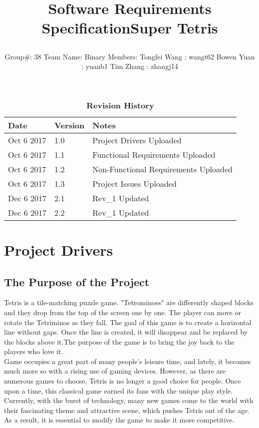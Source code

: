 \documentclass[12pt, titlepage]{article}
\title{\parbox{\linewidth}{\centering Software Requirements Specification\endgraf\bigskip Super Tetris}}
\author{\parbox{\linewidth}{\bigskip \centering Group\#: 38 \endgraf\bigskip Team Name: Binary \endgraf\bigskip Members: \endgraf\bigskip Tongfei Wang : wangt62 \endgraf\bigskip Bowen Yuan : yuanb1 \endgraf\bigskip Tim Zhang : zhangj14}}
\date{\parbox{\linewidth}{\bigskip\bigskip \centering \today\endgraf\bigskip SFWR ENG 3XA3 \endgraf\bigskip McMaster University}}
\begin{document}
\maketitle

\tableofcontents
\listoftables
\listoffigures

\begin{table}[bp]
\caption{\bf Revision History}
\begin{tabularx}{\textwidth}{p{3cm}p{2cm}X}
\toprule {\bf Date} & {\bf Version} & {\bf Notes}\\
\midrule
Oct 6 2017 & 1.0 & Project Drivers Uploaded\\
Oct 6 2017 & 1.1 & Functional Requirements Uploaded\\
Oct 6 2017 & 1.2 & Non-Functional Requirements Uploaded\\
Oct 6 2017 & 1.3 & Project Issues Uploaded\\
Dec 6 2017 & 2.1 & Rev\_1 Updated\\
Dec 6 2017 & 2.2 & Rev\_1 Updated\\
\bottomrule
\end{tabularx}
\end{table}

\newpage


\section{Project Drivers}

\subsection{The Purpose of the Project}
\tab Tetris is a tile-matching puzzle game. "Tetrominoes" are differently shaped
blocks and they drop from the top of the screen one by one. The player can move
or rotate the Tetriminos as they fall. The goal of this game is to create a horizontal
line without gaps. Once the line is created, it will disappear and be replaced by the
blocks above it.The purpose of the game is to bring the joy back to the players
who love it.\\
\tab Game occupies a great part of many people's leisure time, and lately, it
becomes much more so with a rising use of gaming devices. However, as there are
numerous games to choose, Tetris is no longer a good choice for people. Once
upon a time, this classical game earned its fans with the unique play style.
Currently, with the burst of technology, many new games come to the world with
their fascinating theme and attractive scene, which pushes Tetris out of the age.
As a result, it is essential to modify the game to make it more competitive.
\end{document}
